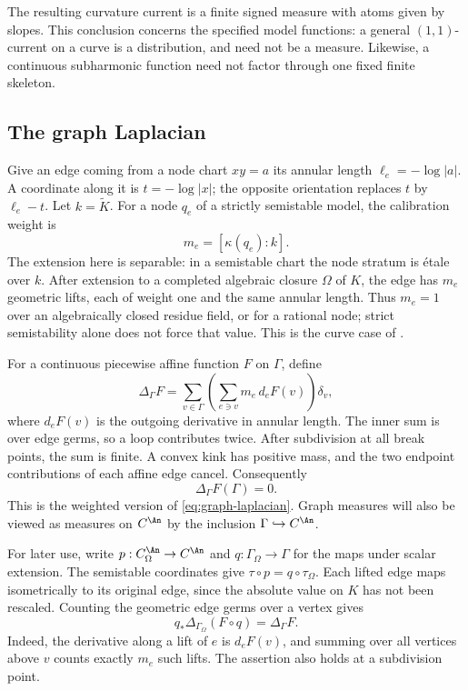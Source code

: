 The resulting curvature current is a finite signed measure with atoms
given by slopes.  This conclusion concerns the specified model
functions: a general $(1,1)$-current on a curve is a distribution,
and need not be a measure.  Likewise, a continuous subharmonic function
need not factor through one fixed finite skeleton.

\subsection{The graph Laplacian}
\label{sec:ch19-graph-laplacian}

Give an edge coming from a node chart $xy=a$ its annular length
$\ell_e=-\log|a|$.  A coordinate along it is $t=-\log|x|$;
the opposite orientation replaces $t$ by $\ell_e-t$.
Let $k=\widetilde K$.  For a node $q_e$ of a strictly semistable
model, the calibration weight is
\[
                         m_e=[\kappa(q_e):k].
\]
The extension here is separable: in a semistable chart the node
stratum is \'etale over $k$.  After extension to a completed algebraic
closure $\Omega$ of $K$, the edge has $m_e$ geometric lifts, each of
weight one and the same annular length.  Thus $m_e=1$ over an
algebraically closed residue field, or for a rational node; strict
semistability alone does not force that value.
This is the curve case of
.

For a continuous piecewise affine function $F$ on $\Gamma$, define
\begin{equation}
\label{eq:cld-curve-graph-laplacian}
 \Delta_\Gamma F
   =\sum_{v\in\Gamma}
      \left(\sum_{e\ni v}m_e\,d_eF(v)\right)\delta_v ,
\end{equation}
where $d_eF(v)$ is the outgoing derivative in annular length.
The inner sum is over edge germs, so a loop contributes twice.
After subdivision at all break points, the sum is finite.
A convex kink has positive mass, and the two endpoint contributions
of each affine edge cancel.  Consequently
\begin{equation}
\label{eq:ch19-lap-mass-zero}
                          \Delta_\Gamma F(\Gamma)=0 .
\end{equation}
This is the weighted version of \eqref{eq:graph-laplacian}.
Graph measures will also be viewed as measures on $C^{\An}$ by the
inclusion $\Gamma\hookrightarrow C^{\An}$.

For later use, write $p:C_\Omega^{\An}\to C^{\An}$ and
$q:\Gamma_\Omega\to\Gamma$ for the maps under scalar extension.
The semistable coordinates give
$\tau\circ p=q\circ\tau_\Omega$.
Each lifted edge maps isometrically to its original edge, since
the absolute value on $K$ has not been rescaled.  Counting the
geometric edge germs over a vertex gives
\begin{equation}
\label{eq:ch19-graph-scalar-descent}
                 q_*\Delta_{\Gamma_\Omega}(F\circ q)
                              =\Delta_\Gamma F .
\end{equation}
Indeed, the derivative along a lift of $e$ is $d_eF(v)$, and summing
over all vertices above $v$ counts exactly $m_e$ such lifts.
The assertion also holds at a subdivision point.


